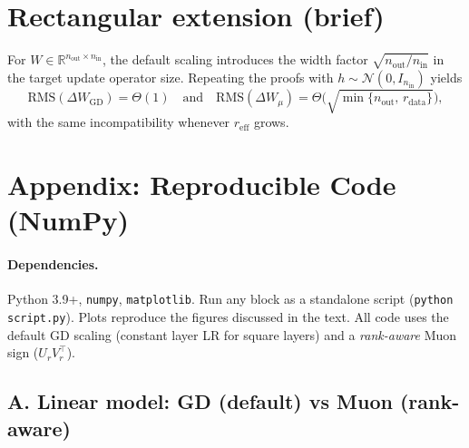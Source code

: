 \documentclass[11pt]{article}
\theoremstyle{definition}
\newcommand{\R}{\mathbb{R}}
\begin{document}
\section{Rectangular extension (brief)}

For $W\in\R^{n_\mathrm{out}\times n_\mathrm{in}}$, the default scaling introduces the width factor $\sqrt{n_\mathrm{out}/n_\mathrm{in}}$ in the target update operator size. Repeating the proofs with $h\sim\mathcal N(0,I_{n_\mathrm{in}})$ yields
\[
\mathrm{RMS}(\Delta W_{\mathrm{GD}})=\Theta(1) \quad\text{and}\quad
\mathrm{RMS}(\Delta W_\mu)=\Theta\!\Big(\sqrt{\min\{n_\mathrm{out},\,r_{\mathrm{data}}\}}\Big),
\]
with the same incompatibility whenever $r_{\mathrm{eff}}$ grows.

\appendix
\section*{Appendix: Reproducible Code (NumPy)}

\paragraph{Dependencies.} Python 3.9+, \texttt{numpy}, \texttt{matplotlib}. Run any block as a standalone script (\texttt{python script.py}). Plots reproduce the figures discussed in the text. All code uses the default GD scaling (constant layer LR for square layers) and a \emph{rank-aware} Muon sign ($U_rV_r^\top$).

\subsection*{A. Linear model: GD (default) vs Muon (rank-aware)}
\end{document}
